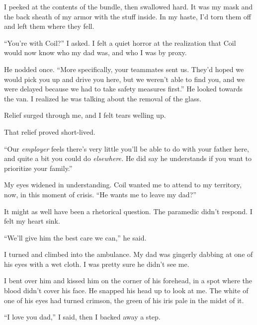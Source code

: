 I peeked at the contents of the bundle, then swallowed hard.  It was my mask and the back sheath of my armor with the stuff inside.  In my haste, I'd torn them off and left them where they fell.



``You're with Coil?'' I asked.  I felt a quiet horror at the realization that Coil would now know who my dad was, and who I was by proxy.



He nodded once.  ``More specifically, your teammates sent us.  They'd hoped we would pick you up and drive you here, but we weren't able to find you, and we were delayed  because we had to take safety measures first.''  He looked towards the van.  I realized he was talking about the removal of the glass.



Relief surged through me, and I felt tears welling up.



That relief proved short-lived.



``Our \emph{employer }feels there's very little you'll be able to do with your father here, and quite a bit you could do \emph{elsewhere.}  He did say he understands if you want to prioritize your family.''



My eyes widened in understanding.  Coil wanted me to attend to my territory, now, in this moment of crisis.  ``He wants me to leave my dad?''



It might as well have been a rhetorical question.  The paramedic didn't respond.  I felt my heart sink.



``We'll give him the best care we can,'' he said.



I turned and climbed into the ambulance.  My dad was gingerly dabbing at one of his eyes with a wet cloth.  I was pretty sure he didn't see me.



I bent over him and kissed him on the corner of his forehead, in a spot where the blood didn't cover his face.  He snapped his head up to look at me.  The white of one of his eyes had turned crimson, the green of his iris pale in the midst of it.



``I love you dad,'' I said, then I backed away a step.



